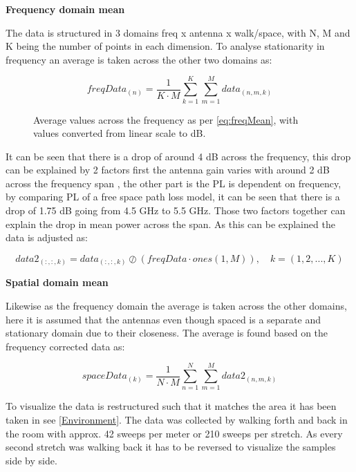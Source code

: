 \textbf{Frequency domain mean}

The data is structured in 3 domains freq x antenna x walk/space, with N, M and K being the number of points in each dimension. To analyse stationarity in frequency an average is taken across the other two domains as:

\begin{equation}\label{eq:freqMean}
freqData_{(n)} = \frac{1}{K\cdot M}\sum_{k = 1}^{K}\sum_{m = 1}^{M} data_{(n,m,k)}
\end{equation}

\begin{figure}[H]
\centering

\caption{Average values across the frequency as per \autoref{eq:freqMean}, with values converted from linear scale to dB.}
\label{fig:meanFading}
\end{figure}

It can be seen that there is a drop of around 4 dB across the frequency, this drop can be explained by 2 factors first the antenna gain varies with around 2 dB across the frequency span , the other part is the \gls{PL} is dependent on frequency, by comparing PL of a free space path loss model, it can be seen that there is a drop of 1.75 dB going from 4.5 GHz to 5.5 GHz. Those two factors together can explain the drop in mean power across the span. As this can be explained the data is adjusted as:

\begin{equation}
data2_{(:,:,k)} =  data_{(:,:,k)} \oslash \left(freqData\cdot ones(1,M)\right), \quad k = (1,2,...,K)
\end{equation}

\textbf{Spatial domain mean}

Likewise as the frequency domain the average is taken across the other domains, here it is assumed that the antennas even though spaced is a separate and stationary domain due to their closeness. The average is found based on the frequency corrected data as:

\begin{equation}\label{eq:spaceMean}
spaceData_{(k)} = \frac{1}{N\cdot M}\sum_{n = 1}^{N}\sum_{m = 1}^{M} data2_{(n,m,k)}
\end{equation}

To visualize the data is restructured such that it matches the area it has been taken in see \autoref{Environment}. The data was collected by walking forth and back in the room with approx. 42 sweeps per meter or 210 sweeps per stretch. As every second stretch was walking back it has to be reversed to visualize the samples side by side. 



